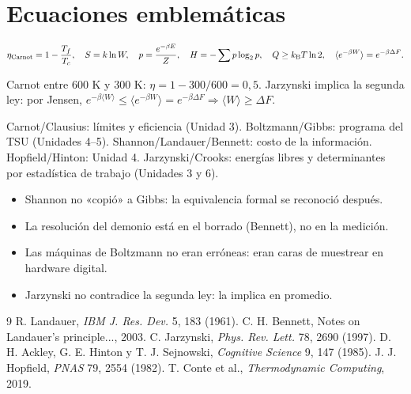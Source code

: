 \documentclass[11pt,a4paper]{article}
\begin{document}
\section{Ecuaciones emblemáticas}
\[\eta_{\text{Carnot}}=1-\frac{T_f}{T_c},\quad S=k\ln W,\quad p=\frac{e^{-\beta E}}{Z},\quad H=-\sum p\log_2p,\quad Q\ge k_{\mathrm B} T\ln2,\quad\langle e^{-\beta W}\rangle=e^{-\beta\Delta F}.\]
\begin{ejemplo}
Carnot entre 600 K y 300 K: $\eta=1-300/600=0{,}5$. Jarzynski implica la segunda ley: por Jensen,
$e^{-\beta\langle W\rangle}\le\langle e^{-\beta W}\rangle=e^{-\beta\Delta F}\Rightarrow\langle W\rangle\ge\Delta F$.
\end{ejemplo}

\begin{aplicacion}
Carnot/Clausius: límites y eficiencia (Unidad 3). Boltzmann/Gibbs: programa del TSU (Unidades 4--5).
Shannon/Landauer/Bennett: costo de la información. Hopfield/Hinton: Unidad 4. Jarzynski/Crooks: energías libres y
determinantes por estadística de trabajo (Unidades 3 y 6).
\end{aplicacion}

\begin{error}
\begin{itemize}[nosep]
\item Shannon no «copió» a Gibbs: la equivalencia formal se reconoció después.
\item La resolución del demonio está en el borrado (Bennett), no en la medición.
\item Las máquinas de Boltzmann no eran erróneas: eran caras de muestrear en hardware digital.
\item Jarzynski no contradice la segunda ley: la implica en promedio.
\end{itemize}
\end{error}

\begin{thebibliography}{9}\small
{} R. Landauer, \emph{IBM J. Res. Dev.} 5, 183 (1961).
 C. H. Bennett, Notes on Landauer's principle..., 2003.
 C. Jarzynski, \emph{Phys. Rev. Lett.} 78, 2690 (1997).
 D. H. Ackley, G. E. Hinton y T. J. Sejnowski, \emph{Cognitive Science} 9, 147 (1985).
 J. J. Hopfield, \emph{PNAS} 79, 2554 (1982).
 T. Conte et al., \emph{Thermodynamic Computing}, 2019.
\end{thebibliography}
\end{document}
